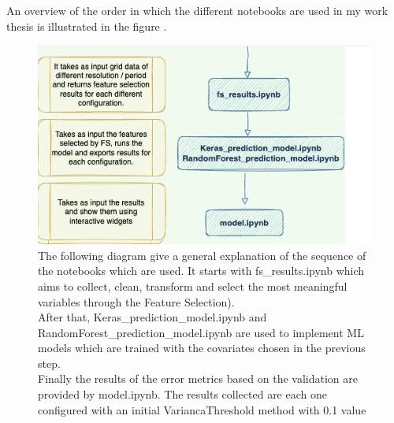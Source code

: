 An overview of the order in which the different notebooks are used in my work thesis is illustrated in the figure .
\begin{figure}[H]
    \centering
    \includegraphics[scale=0.35]{images/overview _notebooks.png}
    \caption{The following diagram give a general explanation of the sequence of the notebooks which are used. It starts with fs\_results.ipynb which aims to collect, clean, transform and select the most meaningful variables through the Feature Selection). \\
    After that, Keras\_prediction\_model.ipynb and RandomForest\_prediction\_model.ipynb are used to implement ML models which are trained with the covariates chosen in the previous step. \\
    Finally the results of the error metrics based on the validation are provided by model.ipynb. 
    The results collected are each one configured with an initial VariancaThreshold method with 0.1 value}
    \label{fig:overview}
\end{figure}
